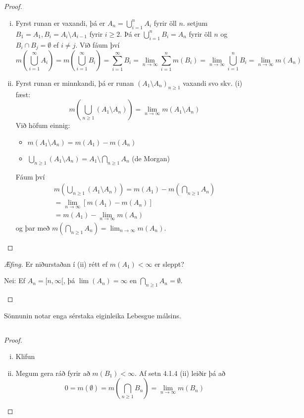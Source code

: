 \documentclass[12pt]{book}
\begin{document}
\subsection{}

\begin{proof}
  \begin{enumerate}[(i)]
  \item Fyrst runan er vaxandi, þá er $A_n = \bigcup_{i=1}^{n} A_i$
    fyrir öll $n$. setjum $B_1 = A_1, B_i = A_i \setminus A_{i-1}$ fyrir $i \geq 2$.
    Þá er $\bigcup_{i=1}^n B_i = A_n$ fyrir öll $n$ og $B_i \cap B_j = \emptyset$ ef
    $i \neq j$. Við fáum því
    \[ m(\bigcup_{i=1}^{\infty} A_i) = m(\bigcup_{i=1}^{\infty} B_i)
    = \sum_{i=1}^{\infty} B_i = \lim_{n \to \infty} \sum_{i =1}^n m(B_i)
    = \lim_{n \to \infty} \bigcup_{i=1}^n B_i  = \lim_{n \to \infty} m(A_n)\]

  \item Fyrst runan er minnkandi, þá er runan $(A_1 \setminus A_n)_{n \geq 1}$
    vaxandi svo skv. (i) fæst:
    \[m(\bigcup_{n\geq 1} (A_1 \setminus A_n)) = \lim_{n \to \infty} m(A_1 \setminus A_n)\]
    Við höfum einnig:
    \begin{itemize}
    \item  $m(A_1 \setminus A_n) = m(A_1) - m(A_n)$
    \item $\bigcup_{n \geq 1} (A_1 \setminus A_n)  = A_1 \setminus \bigcap_{n \geq 1} A_n$ (de Morgan)
    \end{itemize}
    Fáum því 
    \begin{gather*}
      m(\bigcup_{n \geq 1} (A_1 \setminus A_n))
      = m(A_1) - m(\bigcap_{n \geq 1} A_n)\\
      = \lim_{n \to \infty} [m(A_1) - m(A_n)]\\
      = m(A_1) - \lim_{n \to \infty} m(A_n) 
    \end{gather*}
    og þar með $m(\bigcap_{n \geq 1} A_n) = \lim_{n \to \infty} m(A_n)$.
  \end{enumerate}
\end{proof}

\begin{proof}[Æfing]
  Er niðurstaðan í (ii) rétt ef $m(A_1) < \infty$ er sleppt?
  \begin{lausn}
    Nei: Ef $A_n = [n, \infty[$, þá $\lim (A_n) = \infty$
    en $\bigcap_{n \geq 1} A_n = \emptyset$.
  \end{lausn}
\end{proof}

\begin{ath}
  Sönnunin notar enga sérstaka eiginleika Lebesgue málsins.
\end{ath}

\subsection{}

\begin{proof}
  \begin{enumerate}[(i)]
  \item Klifun
  \item Megum gera ráð fyrir að $m(B_1) < \infty$. Af setn 4.1.4 (ii) leiðir
    þá að
    \[ 0 = m(\emptyset) = m(\bigcap_{n \geq 1} B_n)
    = \lim_{n \to \infty} m(B_n) \]
    \end{enumerate}
\end{proof}
\end{document}
